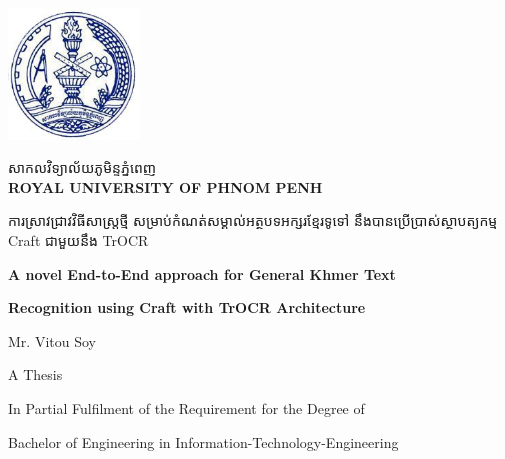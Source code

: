 \begin{titlepage}
    \centering
    \vspace*{1cm}

    \begin{minipage}{0.25\textwidth}
        \includegraphics[width=3.5cm]{figures/RUPP.jpg}
    \end{minipage}
    \hfill
    \begin{minipage}{0.65\textwidth}
        \raggedright
        {\khmerfont\fontsize{16pt}{20pt}\selectfont សាកលវិទ្យាល័យភូមិន្ទភ្នំពេញ\\[0.6em]}
        {\large\bfseries ROYAL UNIVERSITY OF PHNOM PENH}
    \end{minipage}

    \vspace{2cm}

    \begin{minipage}{0.9\textwidth}
        \centering
        {\khmerfont\fontsize{12pt}{20pt}\selectfont ការស្រាវជ្រាវវិធីសាស្ដ្រថ្មី  សម្រាប់កំណត់សម្គាល់អត្ថបទអក្សរខ្មែរទូទៅ នឹងបានប្រើប្រាស់ស្ថាបត្យកម្ម Craft ជាមួយនឹង TrOCR\\[0.4em]}
        {\englishfont\fontsize{15pt}{20pt}\selectfont\bfseries A novel End-to-End approach for General Khmer Text \par}
        {\englishfont\fontsize{15pt}{20pt}\selectfont\bfseries Recognition using Craft with TrOCR Architecture \par}
    \end{minipage}

    \vspace{3.0cm}

    {\englishfont\fontsize{16pt}{20pt}\selectfont Mr. Vitou Soy\par}

    \vspace{3.0cm}

    {\englishfont\fontsize{16pt}{20pt}\selectfont A Thesis\par}
    \vspace{0.5cm}
    {\large In Partial Fulfilment of the Requirement for the Degree of\par}
    {\large Bachelor of Engineering in Information-Technology-Engineering\par}
    


\end{titlepage}
